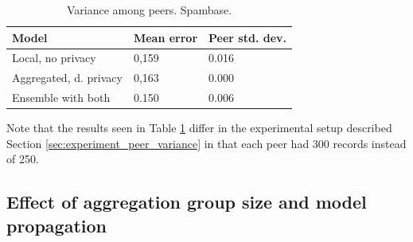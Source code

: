 \begin{table}[H]
	\centering
	
	\begin{tabular}{|l|l|l|}
		\textbf{Model}                  & \textbf{Mean error} & \textbf{Peer std. dev.} \\
		\hline
		Local, no privacy      & 0,159 & 0.016 \\
		Aggregated, d. privacy & 0,163 & 0.000	 \\
		Ensemble with both & 0.150 & 0.006 \\
	\end{tabular}
	\caption{Variance among peers. Spambase.}
	\label{table:peer_variance_spam}
\end{table}

Note that the results seen in Table \ref{table:peer_variance_spam} differ in the experimental setup described Section \ref{sec:experiment_peer_variance} in that each peer had 300 records instead of 250.

\subsection{Effect of aggregation group size and model propagation}


